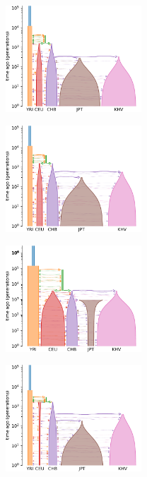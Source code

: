 \begin{figure}
    \centering
    \begin{subfigure}[t]{0.48\textwidth}
        \includegraphics[height=4cm]{images_experiments/bo_human/YRI_CEU_CHB_JPT_KHV_original.pdf}
        \caption{}
        \label{fig:5pop_a}
    \end{subfigure}
    \hfill
    \begin{subfigure}[t]{0.48\textwidth}
        \includegraphics[height=4cm]{images_experiments/bo_human/YRI_CEU_CHB_JPT_KHV_1.pdf}
        \caption{}
        \label{fig:5pop_b}
    \end{subfigure}
        \begin{subfigure}[t]{0.48\textwidth}
        \includegraphics[height=4cm]{images_experiments/bo_human/YRI_CEU_CHB_JPT_KHV_2.pdf}
        \caption{}
        \label{fig:5pop_c}
    \end{subfigure}
    \hfill
    \begin{subfigure}[t]{0.48\textwidth}
        \includegraphics[height=4cm]{images_experiments/bo_human/YRI_CEU_CHB_JPT_KHV_3.pdf}

\end{subfigure}
\end{figure}
